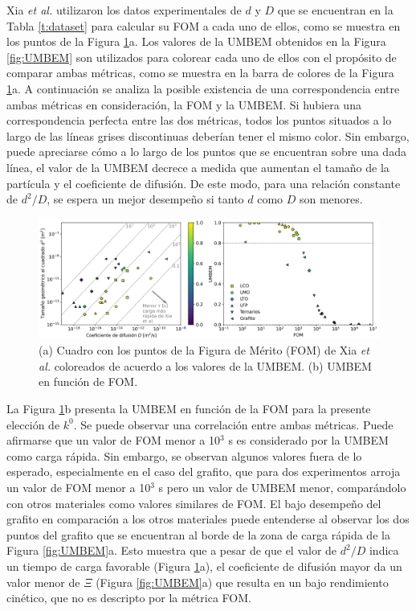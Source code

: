 Xia \textit{et al.} \cite{xia2022} utilizaron los datos experimentales de $d$ y $D$
que se encuentran en la Tabla \ref{t:dataset} para calcular su FOM a cada uno 
de ellos, como se muestra en los puntos de la Figura \ref{fig:xiacomp}a. Los 
valores de la UMBEM obtenidos en la Figura \ref{fig:UMBEM} son utilizados para
colorear cada uno de ellos con el propósito de comparar ambas métricas, como
se muestra en la barra de colores de la Figura \ref{fig:xiacomp}a. A continuación
se analiza la posible existencia de una correspondencia entre ambas métricas en 
consideración, la FOM y la UMBEM. Si hubiera una correspondencia perfecta entre
las dos métricas, todos los puntos situados a lo largo de las líneas grises 
discontinuas deberían tener el mismo color. Sin embargo, puede apreciarse cómo a lo largo de
los puntos que se encuentran sobre una dada línea, el valor de la UMBEM decrece a medida que aumentan el tamaño
de la partícula y el coeficiente de difusión. De
este modo, para una relación constante de $d^2/D$, se espera un mejor desempeño 
si tanto $d$ como $D$ son menores. 
\begin{figure}[h!]
    \centering
    \includegraphics[width=\textwidth]{FastCharging/umbem/xiacomp.png}
    \caption{(a) Cuadro con los puntos de la Figura de Mérito (FOM) de Xia 
    \textit{et al.} coloreados de acuerdo a los valores de la UMBEM. (b) UMBEM en 
    función de FOM.}
    \label{fig:xiacomp}
\end{figure}

La Figura \ref{fig:xiacomp}b presenta la UMBEM en función de la FOM para la 
presente elección de $k^0$. Se puede observar una correlación entre ambas métricas.
Puede afirmarse que un valor de FOM menor a 10$^3$ s es considerado por la UMBEM 
como carga rápida. Sin embargo, se observan algunos valores fuera de lo esperado,
especialmente en el caso del grafito, que para dos experimentos arroja un valor de 
FOM menor a 10$^3$ s pero un valor de UMBEM menor, comparándolo con otros 
materiales como valores similares de FOM. El bajo desempeño del grafito en 
comparación a los otros materiales puede entenderse al observar los dos puntos 
del grafito que se encuentran al borde de la zona de carga rápida de la Figura 
\ref{fig:UMBEM}a. Esto muestra que a pesar de que el valor de $d^2/D$ indica
un tiempo de carga favorable (Figura \ref{fig:xiacomp}a), el coeficiente de 
difusión mayor da un valor menor de $\Xi$ (Figura \ref{fig:UMBEM}a) que resulta
en un bajo rendimiento cinético, que no es descripto por la métrica FOM.

